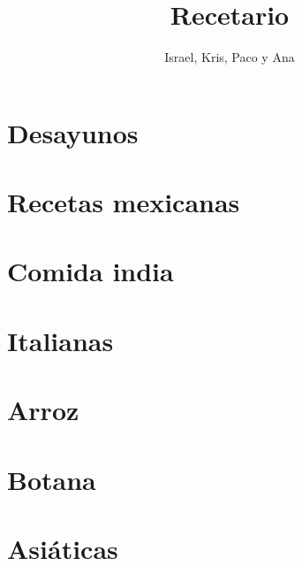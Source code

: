 \documentclass[twoside,12pt]{article}
\date{}
\author{Israel, Kris, Paco y Ana}
\title{Recetario}
\begin{document}
\maketitle

\tableofcontents

\newpage
\section{Desayunos}




\section{Recetas mexicanas}












\section{Comida india}


\section{Italianas}





\section{Arroz}





\section{Botana}


\section{Asi\'aticas}

\end{document}
